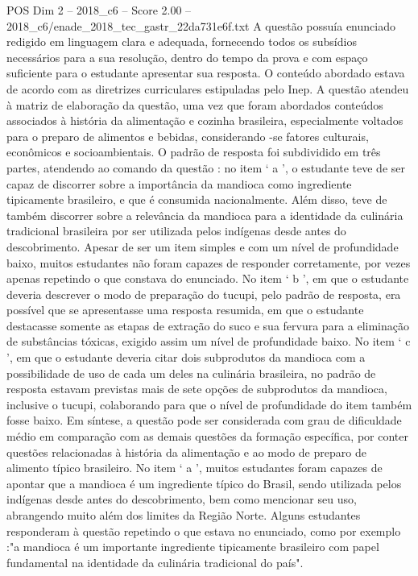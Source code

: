 \begin{textsample}{POS Dim 2 – 2018\_c6 – Score 2.00 – 2018\_c6/enade\_2018\_tec\_gastr\_22da731e6f.txt}
A questão possuía enunciado redigido em linguagem clara e adequada, fornecendo todos os subsídios necessários para a sua resolução, dentro do tempo da prova e com espaço suficiente para o estudante apresentar sua resposta.
O conteúdo abordado estava de acordo com as diretrizes curriculares estipuladas pelo Inep.
A questão atendeu à matriz de elaboração da questão, uma vez que foram abordados conteúdos associados à história da alimentação e cozinha brasileira, especialmente voltados para o preparo de alimentos e bebidas, considerando -se fatores culturais, econômicos e socioambientais.
O padrão de resposta foi subdividido em três partes, atendendo ao comando da questão : no item ‘ a ’, o estudante teve de ser capaz de discorrer sobre a importância da mandioca como ingrediente tipicamente brasileiro, e que é consumida nacionalmente.
Além disso, teve de também discorrer sobre a relevância da mandioca para a identidade da culinária tradicional brasileira por ser utilizada pelos indígenas desde antes do descobrimento.
Apesar de ser um item simples e com um nível de profundidade baixo, muitos estudantes não foram capazes de responder corretamente, por vezes apenas repetindo o que constava do enunciado.
No item ‘ b ’, em que o estudante deveria descrever o modo de preparação do tucupi, pelo padrão de resposta, era possível que se apresentasse uma resposta resumida, em que o estudante destacasse somente as etapas de extração do suco e sua fervura para a eliminação de substâncias tóxicas, exigido assim um nível de profundidade baixo.
No item ‘ c ’, em que o estudante deveria citar dois subprodutos da mandioca com a possibilidade de uso de cada um deles na culinária brasileira, no padrão de resposta estavam previstas mais de sete opções de subprodutos da mandioca, inclusive o tucupi, colaborando para que o nível de profundidade do item também fosse baixo.
Em síntese, a questão pode ser considerada com grau de dificuldade médio em comparação com as demais questões da formação específica, por conter questões relacionadas à história da alimentação e ao modo de preparo de alimento típico brasileiro.
No item ‘ a ’, muitos estudantes foram capazes de apontar que a mandioca é um ingrediente típico do Brasil, sendo utilizada pelos indígenas desde antes do descobrimento, bem como mencionar seu uso, abrangendo muito além dos limites da Região Norte.
Alguns estudantes responderam à questão repetindo o que estava no enunciado, como por exemplo :"a mandioca é um importante ingrediente tipicamente brasileiro com papel fundamental na identidade da culinária tradicional do país".

\end{textsample}
